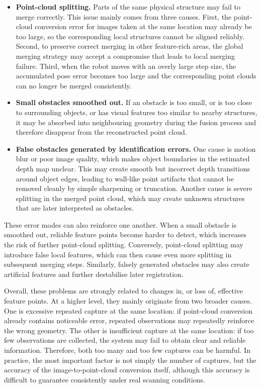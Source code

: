 \documentclass[12pt]{interim_report}
\begin{document}
\begin{itemize}
    \item \textbf{Point-cloud splitting.} Parts of the same physical structure may fail to merge correctly. This issue mainly comes from three causes. First, the point-cloud conversion error for images taken at the same location may already be too large, so the corresponding local structures cannot be aligned reliably. Second, to preserve correct merging in other feature-rich areas, the global merging strategy may accept a compromise that leads to local merging failure. Third, when the robot moves with an overly large step size, the accumulated pose error becomes too large and the corresponding point clouds can no longer be merged consistently.

    \item \textbf{Small obstacles smoothed out.} If an obstacle is too small, or is too close to surrounding objects, or has visual features too similar to nearby structures, it may be absorbed into neighbouring geometry during the fusion process and therefore disappear from the reconstructed point cloud.

    \item \textbf{False obstacles generated by identification errors.} One cause is motion blur or poor image quality, which makes object boundaries in the estimated depth map unclear. This may create smooth but incorrect depth transitions around object edges, leading to wall-like point artifacts that cannot be removed cleanly by simple sharpening or truncation. Another cause is severe splitting in the merged point cloud, which may create unknown structures that are later interpreted as obstacles.
\end{itemize}

These error modes can also reinforce one another. When a small obstacle is smoothed out, reliable feature points become harder to detect, which increases the risk of further point-cloud splitting. Conversely, point-cloud splitting may introduce false local features, which can then cause even more splitting in subsequent merging steps. Similarly, falsely generated obstacles may also create artificial features and further destabilise later registration.

Overall, these problems are strongly related to changes in, or loss of, effective feature points. At a higher level, they mainly originate from two broader causes. One is excessive repeated capture at the same location: if point-cloud conversion already contains noticeable error, repeated observations may repeatedly reinforce the wrong geometry. The other is insufficient capture at the same location: if too few observations are collected, the system may fail to obtain clear and reliable information. Therefore, both too many and too few captures can be harmful. In practice, the most important factor is not simply the number of captures, but the accuracy of the image-to-point-cloud conversion itself, although this accuracy is difficult to guarantee consistently under real scanning conditions.
\end{document}
